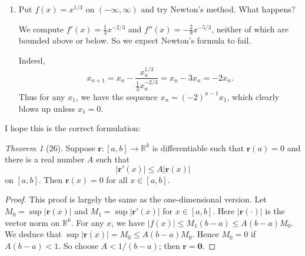 \documentclass[12pt]{article}
\theoremstyle{remark}
\theoremstyle{named}
\newtheorem*{theorem}{Theorem}
\newcommand{\R}{\mathbb R}
\renewcommand{\bf}{\mathbf}
\begin{document}
\begin{enumerate}
\begin{proof}
        Now with the quotient rule, we have \[g'(x) = 1 - \frac{f'(x)f'(x) - f(x)f''(x)}{[f'(x)]^2} - \frac{f(x)f''(x)}{[f'(x)]^2},\]
        which implies that \(g'(x) \to 0\) as \(x \to \xi\).
    \end{proof}

    \item Put \(f(x) = x^{1/3}\) on \((-\infty, \infty)\) and try Newton's method. What happens?
    \newline

    We compute \(f'(x) = \frac{1}{3}x^{-2/3}\) and \(f''(x) = -\frac{2}{9}x^{-5/3}\), neither of which are bounded above or below. So we expect Newton's formula to fail. 

    Indeed, 
    \[x_{n + 1} = x_n - \frac{x_n^{1/3}}{\frac{1}{3}x_n^{-2/3}} = x_n - 3x_n = -2x_n.\]
    Thus for any \(x_1\), we have the sequence \(x_n = (-2)^{n - 1}x_1\), which clearly blows up unless \(x_1 = 0\).
\end{enumerate}

I hope this is the correct formulation:
\begin{theorem}[26]
    Suppose \(\bf r : [a, b] \to \R^k\) is differentiable such that \(\bf r (a) = 0\) and there is a real number \(A\) such that 
    \[|\bf r'(x)| \le A|\bf r(x)|\]
    on \([a, b]\). Then \(\bf r(x) = 0\) for all \(x \in [a, b]\).
\end{theorem}

\begin{proof}
    This proof is largely the same as the one-dimensional version. Let \(M_0 = \sup |\bf r(x)|\) and \(M_1 = \sup |\bf r'(x)|\) for \(x \in [a, b]\). Here \(|\bf r(\cdot)|\) is the vector norm on \(\R^k\). For any \(x\), we have \(|f(x)| \le M_1(b - a) \le A(b - a)M_0\). We deduce that \(\sup |\bf r(x)| = M_0 \le A(b - a)M_0\). Hence \(M_0 = 0\) if \(A(b - a) < 1\). So choose \(A < 1/ (b - a)\); then \(\bf r = \bf 0\).
\end{proof}
\end{document}
